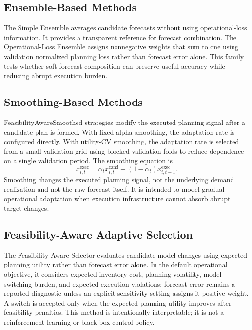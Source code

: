 \subsection{Ensemble-Based Methods}

The Simple Ensemble averages candidate forecasts without using operational-loss information. It provides a transparent reference for forecast combination. The Operational-Loss Ensemble assigns nonnegative weights that sum to one using validation normalized planning loss rather than forecast error alone. This family tests whether soft forecast composition can preserve useful accuracy while reducing abrupt execution burden.

\subsection{Smoothing-Based Methods}

FeasibilityAwareSmoothed strategies modify the executed planning signal after a candidate plan is formed. With fixed-alpha smoothing, the adaptation rate is configured directly. With utility-CV smoothing, the adaptation rate is selected from a small validation grid using blocked validation folds to reduce dependence on a single validation period. The smoothing equation is
\begin{equation}
    x_{i,t}^{\mathrm{exec}}
    =
    \alpha_{t} x_{i,t}^{\mathrm{cand}}
    +
    (1-\alpha_{t})x_{i,t-1}^{\mathrm{exec}}.
\end{equation}
Smoothing changes the executed planning signal, not the underlying demand realization and not the raw forecast itself. It is intended to model gradual operational adaptation when execution infrastructure cannot absorb abrupt target changes.

\subsection{Feasibility-Aware Adaptive Selection}

The Feasibility-Aware Selector evaluates candidate model changes using expected planning utility rather than forecast error alone. In the default operational objective, it considers expected inventory cost, planning volatility, model-switching burden, and expected execution violations; forecast error remains a reported diagnostic unless an explicit sensitivity setting assigns it positive weight. A switch is accepted only when the expected planning utility improves after feasibility penalties. This method is intentionally interpretable; it is not a reinforcement-learning or black-box control policy.


